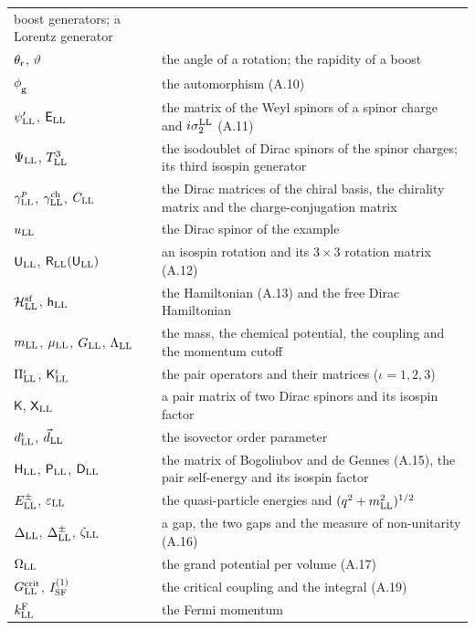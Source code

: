 \documentclass[
  10pt,
]{article}
\begin{document}
\begin{longtable}[]{@{}
  >{\raggedright\arraybackslash}p{}
  >{\raggedright\arraybackslash}p{}@{}}
boost generators; a Lorentz generator \\
\(\theta_{\rm r}\), \(\vartheta\) & the angle of a rotation; the
rapidity of a boost \\
\(\phi_{\mathbf g}\) & the automorphism (A.10) \\
\(\psi'_{\rm LL}\), \(\mathsf E_{\rm LL}\) & the matrix of the Weyl
spinors of a spinor charge and \(i\sigma^{\rm LL}_2\) (A.11) \\
\(\Psi_{\rm LL}\), \(T^3_{\rm LL}\) & the isodoublet of Dirac spinors of
the spinor charges; its third isospin generator \\
\(\gamma^p_{\rm LL}\), \(\gamma^{\rm ch}_{\rm LL}\), \(C_{\rm LL}\) &
the Dirac matrices of the chiral basis, the chirality matrix and the
charge-conjugation matrix \\
\(u_{\rm LL}\) & the Dirac spinor of the example \\
\(\mathsf U_{\rm LL}\), \(\mathsf R_{\rm LL}(\mathsf U_{\rm LL})\) & an
isospin rotation and its \(3\times3\) rotation matrix (A.12) \\
\(\mathcal H^{\rm sf}_{\rm LL}\), \(\mathsf h_{\rm LL}\) & the
Hamiltonian (A.13) and the free Dirac Hamiltonian \\
\(m_{\rm LL}\), \(\mu_{\rm LL}\), \(G_{\rm LL}\), \(\Lambda_{\rm LL}\) &
the mass, the chemical potential, the coupling and the momentum
cutoff \\
\(\Pi^\iota_{\rm LL}\), \(\mathsf K^\iota_{\rm LL}\) & the pair
operators and their matrices (\(\iota=1,2,3\)) \\
\(\mathsf K\), \(\mathsf X_{\rm LL}\) & a pair matrix of two Dirac
spinors and its isospin factor \\
\(d^\iota_{\rm LL}\), \(\vec d_{\rm LL}\) & the isovector order
parameter \\
\(\mathsf H_{\rm LL}\), \(\mathsf P_{\rm LL}\), \(\mathsf D_{\rm LL}\) &
the matrix of Bogoliubov and de Gennes (A.15), the pair self-energy and
its isospin factor \\
\(E^\pm_{\rm LL}\), \(\varepsilon_{\rm LL}\) & the quasi-particle
energies and \((q^2+m_{\rm LL}^2)^{1/2}\) \\
\(\Delta_{\rm LL}\), \(\Delta^\pm_{\rm LL}\), \(\zeta_{\rm LL}\) & a
gap, the two gaps and the measure of non-unitarity (A.16) \\
\(\Omega_{\rm LL}\) & the grand potential per volume (A.17) \\
\(G^{\rm crit}_{\rm LL}\), \(I^{(1)}_{\rm SF}\) & the critical coupling
and the integral (A.19) \\
\(k^{\rm F}_{\rm LL}\) & the Fermi momentum \\
\end{longtable}
\end{document}
